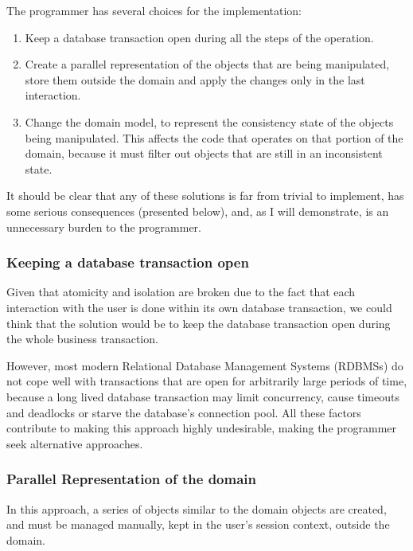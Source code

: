 \documentclass{llncs}
\begin{document}
The programmer has several choices for the implementation:

\begin{enumerate}
\item Keep a database transaction open during all the steps of the
  operation.

\item Create a parallel representation of the objects that are being
  manipulated, store them outside the domain and apply the changes
  only in the last interaction.

\item Change the domain model, to represent the consistency state of
  the objects being manipulated. This affects the code that operates
  on that portion of the domain, because it must filter out objects
  that are still in an inconsistent state.
\end{enumerate}

It should be clear that any of these solutions is far from trivial to
implement, has some serious consequences (presented below), and, as I
will demonstrate, is an unnecessary burden to the programmer.

\subsubsection{Keeping a database transaction open}

Given that atomicity and isolation are broken due to the fact that
each interaction with the user is done within its own database
transaction, we could think that the solution would be to keep the
database transaction open during the whole business transaction.

However, most modern Relational Database Management Systems (RDBMSs)
do not cope well with transactions that are open for arbitrarily large
periods of time, because a long lived database transaction may limit
concurrency, cause timeouts and deadlocks or starve the database's
connection pool. All these factors contribute to making this approach
highly undesirable, making the programmer seek alternative approaches.

\subsubsection{Parallel Representation of the domain}

In this approach, a series of objects similar to the domain objects
are created, and must be managed manually, kept in the user's session
context, outside the domain.
\end{document}
